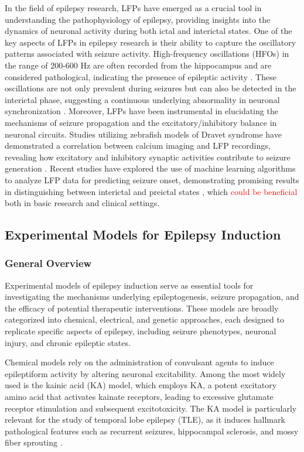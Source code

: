\documentclass{article}
\begin{document}
In the field of epilepsy research, LFPs have emerged as a crucial tool in understanding the pathophysiology of epilepsy, providing insights into the dynamics of neuronal activity during both ictal and interictal states. One of the key aspects of LFPs in epilepsy research is their ability to capture the oscillatory patterns associated with seizure activity. High-frequency oscillations (HFOs) in the range of 200-600 Hz are often recorded from the hippocampus and are considered pathological, indicating the presence of epileptic activity \cite{molnar2023, rolston2010}. These oscillations are not only prevalent during seizures but can also be detected in the interictal phase, suggesting a continuous underlying abnormality in neuronal synchronization \cite{satzer2023}. Moreover, LFPs have been instrumental in elucidating the mechanisms of seizure propagation and the excitatory/inhibitory balance in neuronal circuits. Studies utilizing zebrafish models of Dravet syndrome have demonstrated a correlation between calcium imaging and LFP recordings, revealing how excitatory and inhibitory synaptic activities contribute to seizure generation \cite{brenet2019, cozzolino2020}. Recent studies have explored the use of machine learning algorithms to analyze LFP data for predicting seizure onset, demonstrating promising results in distinguishing between interictal and preictal states \cite{aghagolzadeh2016, budde2022}, which \textcolor{red}{could be beneficial} both in basic research and clinical settings.

\subsection{Experimental Models for Epilepsy Induction}
\subsubsection{General Overview}

Experimental models of epilepsy induction serve as essential tools for investigating the mechanisms underlying epileptogenesis, seizure propagation, and the efficacy of potential therapeutic interventions. These models are broadly categorized into chemical, electrical, and genetic approaches, each designed to replicate specific aspects of epilepsy, including seizure phenotypes, neuronal injury, and chronic epileptic states.

Chemical models rely on the administration of convulsant agents to induce epileptiform activity by altering neuronal excitability. Among the most widely used is the kainic acid (KA) model, which employs KA, a potent excitatory amino acid that activates kainate receptors, leading to excessive glutamate receptor stimulation and subsequent excitotoxicity. The KA model is particularly relevant for the study of temporal lobe epilepsy (TLE), as it induces hallmark pathological features such as recurrent seizures, hippocampal sclerosis, and mossy fiber sprouting \cite{rubio2024}.
\end{document}
